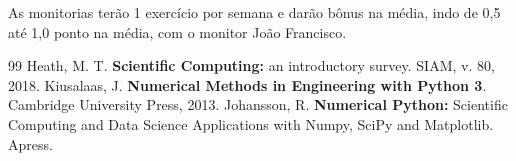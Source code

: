 \documentclass[12pt, a4paper]{article}
\theoremstyle{definition}
\begin{document}
As monitorias terão 1 exercício por semana e darão bônus na média, indo de 0,5 até 1,0 ponto na média, com o monitor João Francisco.
\newpage


\newpage

\newpage

\newpage

\newpage

\newpage

\newpage

\newpage

\newpage

\newpage

\newpage

\newpage

\newpage

\newpage

\newpage

\newpage

\newpage

\newpage

\newpage

\newpage

\begin{thebibliography}{99}
	 Heath, M. T. \textbf{Scientific Computing:} an introductory survey. SIAM, v. 80, 2018.
	 Kiusalaas, J. \textbf{Numerical Methods in Engineering with Python 3}. Cambridge University Press, 2013.
	 Johansson, R. \textbf{Numerical Python:} Scientific Computing and Data Science Applications with Numpy, SciPy and Matplotlib. Apress.
\end{thebibliography}
\end{document}
